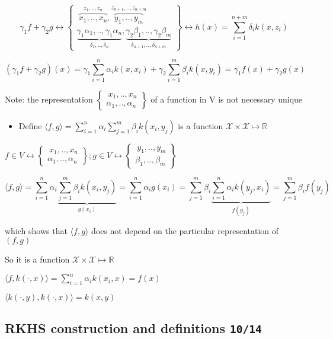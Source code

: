\documentclass[10pt,portrait]{article}
\providecommand{\tightlist}{%
  \setlength{\itemsep}{0pt}\setlength{\parskip}{0pt}}
\begin{document}
\[\gamma_1f+\gamma_2g\leftrightarrow\begin{Bmatrix}\ \overbrace{x_1,..,x_n}^{z_1,..,z_n},\overbrace{y_1,..,y_m}^{z_{n+1},..,z_{n+m}}\\
                     \underbrace{\gamma_1\alpha_1,..,\gamma_1\alpha_n}_{\delta_1,..,\delta_n},\underbrace{\gamma_2\beta_1,..,\gamma_2\beta_m}_{\delta_{n+1},..,\delta_{n+m}}\end{Bmatrix}
                     \leftrightarrow h(x)=\sum_{i=1}^{n+m}\delta_ik(x,z_i)\]

\[(\gamma_1f+\gamma_2g)(x)=\gamma_1\sum_{i=1}^n\alpha_ik(x,x_i)+\gamma_2\sum_{i=1}^m\beta_ik(x,y_i)=\gamma_1f(x)+\gamma_2g(x)\]

Note: the representation
\(\begin{Bmatrix}\ x_1,..,x_n\\\alpha_1,..,\alpha_n\end{Bmatrix}\) of a
function in V is not necessary unique

\begin{itemize}
\tightlist
\item
  Define
  \(\langle f,g\rangle=\sum_{i=1}^n\alpha_i\sum_{j=1}^m\beta_ik(x_i,y_j)\)
  is a function \(\mathcal{X}\times\mathcal{X}\mapsto\mathbb{R}\)
\end{itemize}

\(f\in V\leftrightarrow\begin{Bmatrix}\ x_1,..,x_n\\\alpha_1,..,\alpha_n\end{Bmatrix};g\in V\leftrightarrow\begin{Bmatrix}\ y_1,..,y_m\\\beta_1,..,\beta_m\end{Bmatrix}\)

\[\langle f,g\rangle=\sum_{i=1}^n\alpha_i\underbrace{\sum_{j=1}^m\beta_ik(x_i,y_j)}_{g(x_i)}=\sum_{i=1}^n\alpha_ig(x_i)
=\sum_{j=1}^m\beta_i\underbrace{\sum_{i=1}^n\alpha_ik(y_j,x_i)}_{f(y_j)}=\sum_{j=1}^m\beta_if(y_j)\]

which shows that \(\langle f,g\rangle\) does not depend on the
particular representation of \((f,g)\)

So it is a function \(\mathcal{X}\times\mathcal{X}\mapsto\mathbb{R}\)

\(\langle f,k(\cdot,x)\rangle=\sum_{i=1}^n\alpha_ik(x_i,x)=f(x)\)

\(\langle k(\cdot,y),k(\cdot,x)\rangle=k(x,y)\)

\hypertarget{rkhs-construction-and-definitions-1014}{%
\subsection{\texorpdfstring{RKHS construction and definitions
\texttt{10/14}}{RKHS construction and definitions 10/14}}\label{rkhs-construction-and-definitions-1014}}
\end{document}
